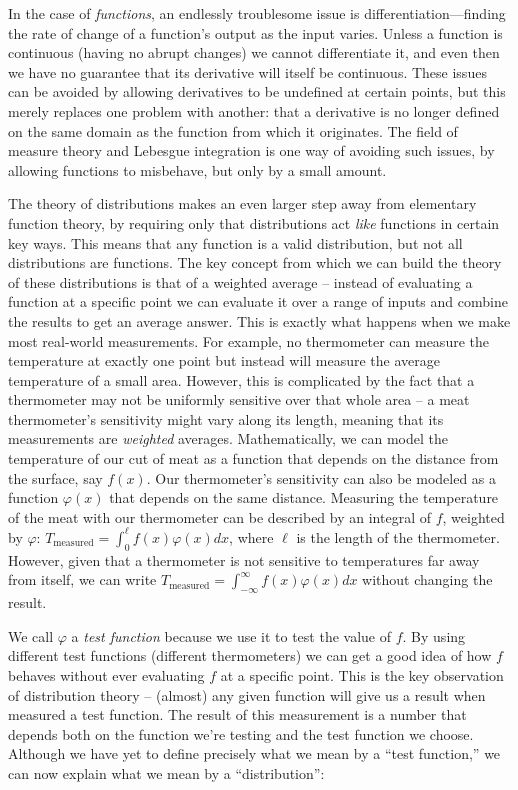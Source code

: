     In the case of \emph{functions}, an endlessly troublesome issue is differentiation---finding the rate of change of a function's output as the input varies.
    Unless a function is continuous (having no abrupt changes) we cannot differentiate it, and even then we have no guarantee that its derivative will itself be continuous.
    These issues can be avoided by allowing derivatives to be undefined at certain points, but this merely replaces one problem with another: that a derivative is no longer defined on the same domain as the function from which it originates.
    The field of measure theory and Lebesgue integration is one way of avoiding such issues, by allowing functions to misbehave, but only by a small amount.

    The theory of distributions makes an even larger step away from elementary function theory, by requiring only that distributions act \emph{like} functions in certain key ways.
    This means that any function is a valid distribution, but not all distributions are functions.
    The key concept from which we can build the theory of these distributions is that of a weighted average -- instead of evaluating a function at a specific point we can evaluate it over a range of inputs and combine the results to get an average answer.
    This is exactly what happens when we make most real-world measurements.
    For example, no thermometer can measure the temperature at exactly one point but instead will measure the average temperature of a small area.
    However, this is complicated by the fact that a thermometer may not be uniformly sensitive over that whole area -- a meat thermometer's sensitivity might vary along its length, meaning that its measurements are \emph{weighted} averages. 
    Mathematically, we can model the temperature of our cut of meat as a function that depends on the distance from the surface, say $f(x)$.
    Our thermometer's sensitivity can also be modeled as a function $\varphi(x)$ that depends on the same distance.
    Measuring the temperature of the meat with our thermometer can be described by an integral of $f$, weighted by $\varphi$: $T_\text{measured} = \int_0^\ell f(x)\varphi(x) dx$, where $\ell$ is the length of the thermometer.
    However, given that a thermometer is not sensitive to temperatures far away from itself, we can write $T_\text{measured} = \int_{-\infty}^{\infty} f(x)\varphi(x)dx$ without changing the result.

    We call $\varphi$ a \emph{test function} because we use it to test the value of $f$.
    By using different test functions (different thermometers) we can get a good idea of how $f$ behaves without ever evaluating $f$ at a specific point.
    This is the key observation of distribution theory -- (almost) any given function will give us a result when measured a test function.
    The result of this measurement is a number that depends both on the function we're testing and the test function we choose.
    Although we have yet to define precisely what we mean by a ``test function,'' we can now explain what we mean by a ``distribution'':

